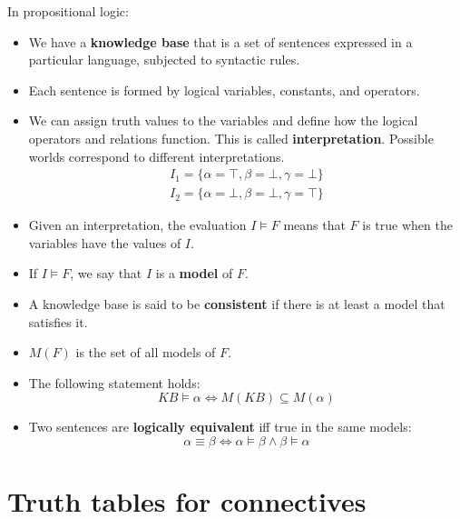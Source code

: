 \documentclass{article}
\begin{document}
\newpage

In propositional logic:
\begin{itemize}
    \item We have a \textbf{knowledge base} that is a set of sentences expressed in a particular language, subjected to syntactic rules.
    \item Each sentence is formed by logical variables, constants, and operators.
    \item We can assign truth values to the variables and define how the logical operators and relations function. This is called \textbf{interpretation}. Possible worlds correspond to different interpretations.
    \begin{equation*}
        \begin{aligned}
            I_1 = \{\alpha = \top, \beta = \bot, \gamma = \bot \} \\    
            I_2= \{\alpha = \bot, \beta = \bot, \gamma = \top \}
        \end{aligned}
    \end{equation*}
    \item Given an interpretation, the evaluation $I \models F$ means that $F$ is true when the variables have the values of $I$.
    \item If $I \models F$, we say that $I$ is a \textbf{model} of $F$.
    \item A knowledge base is said to be \textbf{consistent} if there is at least a model that satisfies it.
    \item $M(F)$ is the set of all models of $F$.
    \item The following statement holds:
    \begin{equation*}
        KB \models \alpha \iff M(KB) \subseteq M(\alpha)
    \end{equation*}
    \item Two sentences are \textbf{logically equivalent} iff true in the same models:
    \begin{equation*}
        \alpha \equiv \beta \iff \alpha \models \beta \land \beta \models \alpha
    \end{equation*}
\end{itemize}

\newpage

\section*{Truth tables for connectives}
\end{document}
